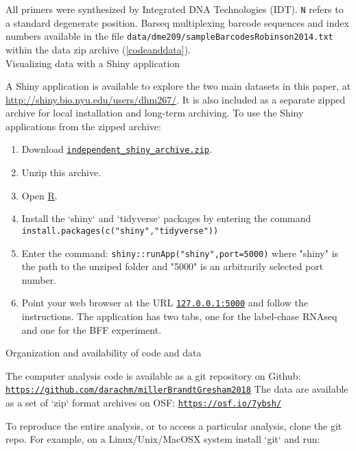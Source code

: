 {All primers were synthesized by Integrated DNA Technologies (IDT).
\texttt{N} refers to a standard degenerate position.
\label{tab:indexbarcodes}
Barseq multiplexing barcode sequences and index numbers available in 
the file 
\texttt{data/dme209/sampleBarcodesRobinson2014.txt} within the
data zip archive (\autoref{codeanddata}). \\


  \label{shiny}
  Visualizing data with a Shiny application
  
  A Shiny application is available to explore the two main 
  datasets in this paper, at
  \url{http://shiny.bio.nyu.edu/users/dhm267/}. It
  is also included as a separate zipped archive for local
  installation and long-term archiving. 
  To use the Shiny applications from the zipped archive: 
  
  \begin{enumerate}
  \item Download
  \href{https://osf.io/ecyj9/}{\texttt{independent\_shiny\_archive.zip}}.
  \item Unzip this archive.
  \item Open \href{http://cran.r-project.org/}{R}.
  \item Install the `shiny` and `tidyverse` packages by entering the command
    \texttt{install.packages(c("shiny","tidyverse"))}
  \item Enter the command: 
    \texttt{shiny::runApp("shiny",port=5000)}
    where "shiny" is the path to the unziped folder and "5000" is 
    an arbitrarily selected port number.
  \item Point your web browser at the URL \texttt{\url{127.0.0.1:5000}}
      and follow the instructions. The application has two tabs,
      one for the label-chase RNAseq and one for the BFF experiment.
  \end{enumerate}

  \label{codeanddata}
  Organization and availability of code and data
  
  \begin{flushleft}
  The computer analysis code is available as a git
  repository on Github: \break
  \texttt{\url{https://github.com/darachm/millerBrandtGresham2018}} \break
  The data are available as a set of `zip` format archives on OSF: \break
  \texttt{\url{https://osf.io/7ybsh/}}
  \end{flushleft}
  
  To reproduce the entire analysis, or to access a particular 
  analysis, clone the git repo. For example, on a 
  Linux/Unix/MacOSX system install `git` and run:
  
}
